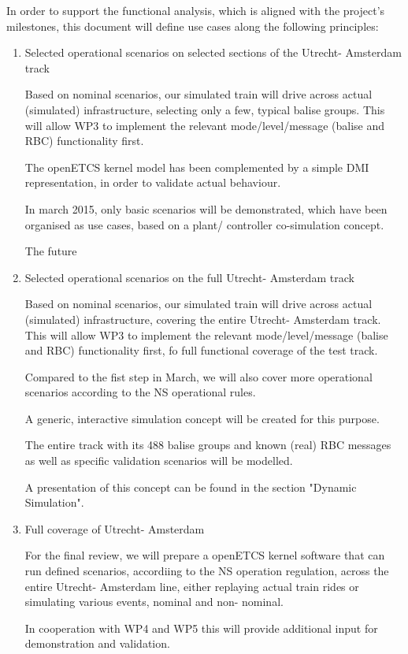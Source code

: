 In order to support the functional analysis, which is aligned with the project's milestones, this document will define use cases along the following principles:

\begin{enumerate}
\item Selected operational scenarios on selected sections of the Utrecht- Amsterdam track

Based on nominal scenarios, our simulated train will drive across actual (simulated) infrastructure, selecting only a few, typical balise groups.
This will allow WP3 to implement the relevant mode/level/message (balise and RBC) functionality first.

The openETCS kernel model has been complemented by a simple DMI representation, in order to validate actual behaviour. 

In march 2015, only basic scenarios will be demonstrated, which have been organised as use cases, based on a plant/ controller co-simulation concept.

The future 


\item Selected operational scenarios on the full Utrecht- Amsterdam track

Based on nominal scenarios, our simulated train will drive across actual (simulated) infrastructure, covering the entire Utrecht- Amsterdam track.
This will allow WP3 to implement the relevant mode/level/message (balise and RBC) functionality first, fo full functional coverage of the test track.

Compared to the fist step in March, we will also cover more operational scenarios according to the NS operational rules.

A generic, interactive simulation concept will be created for this purpose. 

The entire track with its 488 balise groups and known (real) RBC messages as well as specific validation scenarios will be modelled.

A presentation of this concept can be found in the section "Dynamic Simulation".

\item Full coverage of Utrecht- Amsterdam

For the final review, we will prepare a openETCS kernel software that can run defined scenarios, accordiing to the NS operation regulation, across the entire Utrecht- Amsterdam line, either replaying actual train rides or simulating various events, nominal and non- nominal.

In cooperation with WP4 and WP5 this will provide additional input for demonstration and validation.
\end{enumerate}



